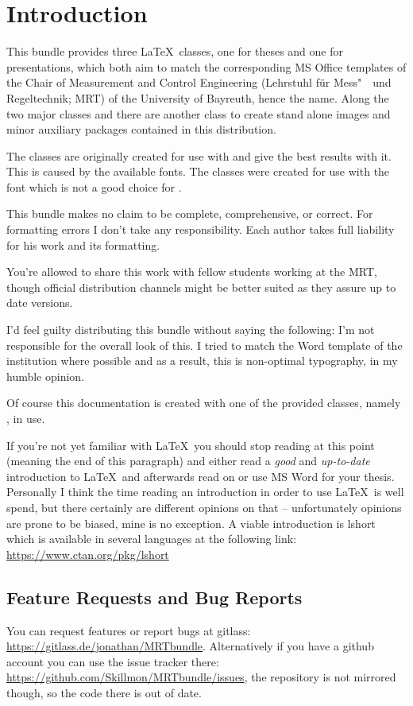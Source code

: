 \chapter{Introduction}
This bundle provides three \LaTeX\ classes, one for theses and one for
presentations, which both aim to match the corresponding MS Office templates of
the Chair of Measurement and Control Engineering (Lehrstuhl für Mess"~~und
Regeltechnik; MRT) of the University of Bayreuth, hence the name. Along the two
major classes  and  there are another class to
create stand alone images and minor auxiliary packages contained in this
distribution.

The classes are originally created for use with  and give the
best results with it. This is caused by the available fonts. The classes were
created for use with the  font which is not a good choice for
\luaxelatex*.

This bundle makes no claim to be complete, comprehensive, or correct. For
formatting errors I don't take any responsibility. Each author takes full
liability for his work and its formatting.

You're allowed to share this work with fellow students working at the MRT,
though official distribution channels might be better suited as they assure up
to date versions.

I'd feel guilty distributing this bundle without saying the following: I'm not
responsible for the overall look of this. I tried to match the Word template of
the institution where possible and as a result, this is non-optimal typography,
in my humble opinion.

Of course this documentation is created with one of the provided classes, namely
, in use.

If you're not yet familiar with \LaTeX\ you should stop reading at this point
(meaning the end of this paragraph) and either read a \emph{good} and
\emph{up-to-date} introduction to \LaTeX\ and afterwards read on or use MS Word
for your thesis. Personally I think the time reading an introduction in order to
use \LaTeX\ is well spend, but there certainly are different opinions on that --
unfortunately opinions are prone to be biased, mine is no exception. A viable
introduction is lshort which is available in several languages at the following
link: \url{https://www.ctan.org/pkg/lshort}

\section{Feature Requests and Bug Reports}\label{sec:bugs}
You can request features or report bugs at gitlass:
\url{https://gitlass.de/jonathan/MRTbundle}. Alternatively if you have a github
account you can use the issue tracker there:
\url{https://github.com/Skillmon/MRTbundle/issues}, the repository is not
mirrored though, so the code there is out of date.

